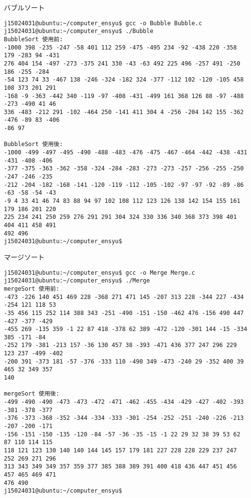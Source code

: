 \documentclass[a4j,titlepage]{jarticle}
\begin{document}
\begin{breakitembox}[l]{バブルソート} \small
\begin{verbatim}
j15024031@ubuntu:~/computer_ensyu$ gcc -o Bubble Bubble.c
j15024031@ubuntu:~/computer_ensyu$ ./Bubble
BubbleSort 使用前:
-1000 398 -235 -247 -58 401 112 259 -475 -495 234 -92 -438 220 -358 179 -283 94 -431 
276 404 154 -497 -273 -375 241 330 -43 -63 492 225 496 -257 491 -250 186 -255 -284 
-54 123 74 33 -467 138 -246 -324 -182 324 -377 -112 102 -120 -105 458 108 373 201 291 
-168 -9 -363 -442 340 -119 -97 -408 -431 -499 161 368 126 88 -97 -488 -273 -490 41 46
336 -483 -212 291 -102 -464 250 -141 411 304 4 -256 -204 142 155 -362 -476 -89 83 -406 
-86 97 

BubbleSort 使用後:
-1000 -499 -497 -495 -490 -488 -483 -476 -475 -467 -464 -442 -438 -431 -431 -408 -406 
-377 -375 -363 -362 -358 -324 -284 -283 -273 -273 -257 -256 -255 -250 -247 -246 -235 
-212 -204 -182 -168 -141 -120 -119 -112 -105 -102 -97 -97 -92 -89 -86 -63 -58 -54 -43 
-9 4 33 41 46 74 83 88 94 97 102 108 112 123 126 138 142 154 155 161 179 186 201 220 
225 234 241 250 259 276 291 291 304 324 330 336 340 368 373 398 401 404 411 458 491 
492 496 
j15024031@ubuntu:~/computer_ensyu$ 
\end{verbatim}
\end{breakitembox}

\begin{breakitembox}[l]{マージソート} \small
\begin{verbatim}
j15024031@ubuntu:~/computer_ensyu$ gcc -o Merge Merge.c
j15024031@ubuntu:~/computer_ensyu$ ./Merge
mergeSort 使用前:
-473 -226 140 451 469 228 -368 271 471 145 -207 313 228 -344 227 -434 -254 121 118 53
-35 456 115 252 114 388 343 -251 -490 -151 -150 -462 476 -156 490 447 -427 -377 -429 
-455 269 -135 359 -1 22 87 418 -378 62 389 -472 -120 -301 144 -15 -334 385 -171 -84 
-252 179 -381 -213 157 -36 130 457 38 -393 -471 436 377 247 296 229 123 237 -499 -402
-200 391 -373 181 -57 -376 -333 110 -490 349 -473 -240 29 -352 400 39 465 32 349 357 
140 

mergeSort 使用後:
-499 -490 -490 -473 -473 -472 -471 -462 -455 -434 -429 -427 -402 -393 -381 -378 -377 
-376 -373 -368 -352 -344 -334 -333 -301 -254 -252 -251 -240 -226 -213 -207 -200 -171 
-156 -151 -150 -135 -120 -84 -57 -36 -35 -15 -1 22 29 32 38 39 53 62 87 110 114 115 
118 121 123 130 140 140 144 145 157 179 181 227 228 228 229 237 247 252 269 271 296 
313 343 349 349 357 359 377 385 388 389 391 400 418 436 447 451 456 457 465 469 471 
476 490 
j15024031@ubuntu:~/computer_ensyu$ 
\end{verbatim}
\end{breakitembox}
\end{document}
